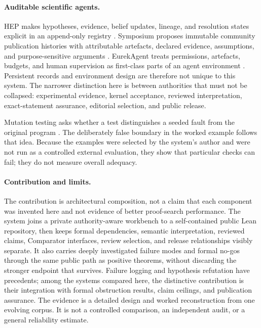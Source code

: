 \documentclass[10pt]{article}
\begin{document}
\paragraph{Auditable scientific agents.}
HEP makes hypotheses, evidence, belief updates, lineage, and resolution states
explicit in an append-only registry \cite{hep}. Symposium proposes immutable
community publication histories with attributable artefacts, declared
evidence, assumptions, and purpose-sensitive arguments \cite{symposium}.
EurekAgent treats permissions, artefacts, budgets, and human supervision as
first-class parts of an agent environment \cite{eurekagent}. Persistent records
and environment design are therefore not unique to this system. The narrower
distinction here is between authorities that must not be collapsed:
experimental evidence, kernel acceptance, reviewed interpretation,
exact-statement assurance, editorial selection, and public release.

Mutation testing asks whether a test distinguishes a seeded fault from the
original program \cite{demillo,jiaharman}. The deliberately false boundary in
the worked example follows that idea. Because the examples were selected by
the system's author and were not run as a controlled external evaluation, they
show that particular checks can fail; they do not measure overall adequacy.

\paragraph{Contribution and limits.}
The contribution is architectural composition, not a claim that each component
was invented here and not evidence of better proof-search performance. The
system joins a private authority-aware workbench to a self-contained public
Lean repository, then keeps formal dependencies, semantic interpretation,
reviewed claims, Comparator interfaces, review selection, and release
relationships visibly separate. It also carries deeply investigated failure
modes and formal no-gos through the same public path as positive theorems,
without discarding the stronger endpoint that survives. Failure logging and
hypothesis refutation have precedents; among the systems compared here, the
distinctive contribution is their integration with formal obstruction results,
claim ceilings, and publication assurance. The evidence is a detailed design
and worked reconstruction from one evolving corpus. It is not a controlled
comparison, an independent audit, or a general reliability estimate.
\end{document}
